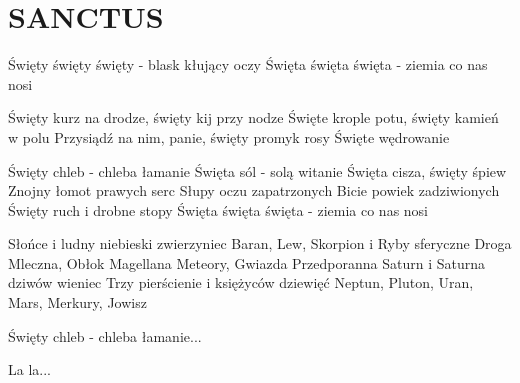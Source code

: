 \documentclass[../../../songbook.tex]{subfiles}
\begin{document}
\TabPositions{8cm} %
\section*{SANCTUS}	
{}
\vspace{0.5cm}
			
Święty święty święty - blask kłujący oczy \newline
Święta święta święta - ziemia co nas nosi \newline
	
Święty kurz na drodze, święty kij przy nodze	 \newline
Święte krople potu, święty kamień w polu	    \newline
Przysiądź na nim, panie, święty promyk rosy	    \newline
Święte wędrowanie					            \newline

\-\hspace{1cm} Święty chleb - chleba łamanie	 \newline
\-\hspace{1cm} Święta sól - solą witanie		 \newline
\-\hspace{1cm} Święta cisza, święty śpiew		 \newline
\-\hspace{1cm} Znojny łomot prawych serc		 \newline
\-\hspace{1cm} Słupy oczu zapatrzonych			\newline
\-\hspace{1cm} Bicie powiek zadziwionych		\newline
\-\hspace{1cm} Święty ruch i drobne stopy		\newline
\-\hspace{1cm} Święta święta święta - ziemia co nas nosi \newline

Słońce i ludny niebieski zwierzyniec		 \newline
Baran, Lew, Skorpion i Ryby sferyczne		 \newline
Droga Mleczna, Obłok Magellana			     \newline
Meteory, Gwiazda Przedporanna			     \newline
Saturn i Saturna dziwów wieniec			\newline
Trzy pierścienie i księżyców dziewięć	\newline
Neptun, Pluton, Uran, Mars, Merkury, Jowisz  \newline
	
\-\hspace{1cm} Święty chleb - chleba łamanie... \newline

La la...
\end{document}
